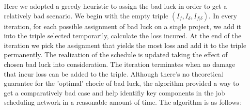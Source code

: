 \documentclass[final,3p,times]{elsarticle}
\begin{document}
Here we adopted a greedy heuristic to assign the bad luck in order to get a relatively bad scenario. We begin with the empty triple  $(I_f, I_{\delta}, I_{f|\delta})$. In every iteration, for each possible assignment of bad luck on a single project, we add it into the triple selected temporarily, calculate the loss incured. At the end of the iteration we  pick the assignment that yields the most loss and add it to the triple permanently.  The realization of the schedule is updated taking the effect of chosen bad luck into consideration. The iteration terminates when no damage that incur loss can be added to the triple. Although there's no theoretical guarantee for the 'optimal' chocie of bad luck, the algorithm provided a way to get a comparatively bad case and help identifiy key components in the job scheduling network in a reasonable amount of time. The algorithm is as follows:
\linebreak
\begin{algorithm}[H]\label{EstimateWorst}
\end{algorithm} 
\end{document}
